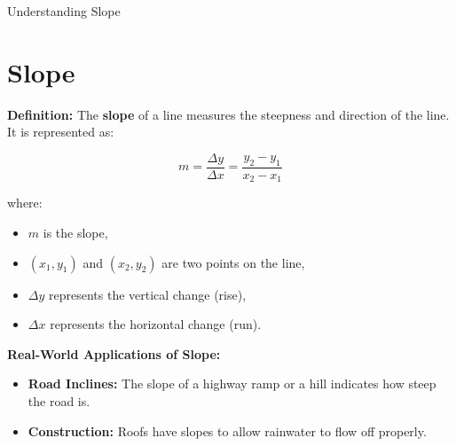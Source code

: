 \documentclass{beamer}
\begin{document}
\begin{frame}
\end{frame}
\begin{frame}{Understanding Slope}
\section{Slope}

    \textbf{Definition:}  
    The \textbf{slope} of a line measures the steepness and direction of the line. It is represented as:

    \[
    m = \frac{\Delta y}{\Delta x} = \frac{y_2 - y_1}{x_2 - x_1}
    \]

    where:
    \begin{itemize}
        \item \( m \) is the slope,
        \item \( (x_1, y_1) \) and \( (x_2, y_2) \) are two points on the line,
        \item \( \Delta y \) represents the vertical change (rise),
        \item \( \Delta x \) represents the horizontal change (run).
    \end{itemize}

    \vspace{0.5cm}
    \textbf{Real-World Applications of Slope:}
    \begin{itemize}
        \item \textbf{Road Inclines:} The slope of a highway ramp or a hill indicates how steep the road is.
        \item \textbf{Construction:} Roofs have slopes to allow rainwater to flow off properly.

    \end{itemize}

\end{frame}
\end{document}
